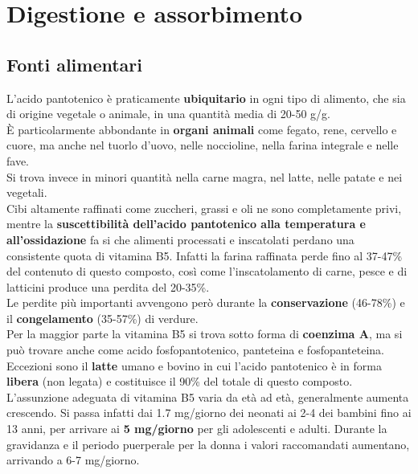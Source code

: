 \documentclass[a4paper, 12pt]{article}
\begin{document}
\section{Digestione e assorbimento}

\subsection{Fonti alimentari}
L’acido pantotenico è praticamente \textbf{ubiquitario} in ogni tipo di alimento, che sia di origine vegetale o animale, in una quantità media di 20-50 {\textmu}g/g.\\
È particolarmente abbondante in \textbf{organi animali} come fegato, rene, cervello e cuore, ma anche nel tuorlo d’uovo, nelle noccioline, nella farina integrale e nelle fave.\\
Si trova invece in minori quantità nella carne magra, nel latte, nelle patate e nei vegetali.\\
Cibi altamente raffinati come zuccheri, grassi e oli ne sono completamente privi, mentre la \textbf{suscettibilità dell’acido pantotenico alla temperatura e all’ossidazione} fa si che alimenti processati  e inscatolati perdano una consistente quota di vitamina B5. Infatti la farina raffinata perde fino al 37-47\% del contenuto di questo composto, così come l’inscatolamento di carne, pesce e di latticini produce una perdita del 20-35\%.\\
Le perdite più importanti avvengono però durante la \textbf{conservazione} (46-78\%) e il \textbf{congelamento} (35-57\%) di verdure.\\
Per la maggior parte la vitamina B5 si trova sotto forma di \textbf{coenzima A}, ma si può trovare anche come acido fosfopantotenico, panteteina e fosfopanteteina. Eccezioni sono il \textbf{latte} umano e bovino in cui l’acido pantotenico è in forma \textbf{libera} (non legata) e costituisce il 90\% del totale di questo composto.\\
L’assunzione adeguata di vitamina B5 varia da età ad età, generalmente aumenta crescendo. Si passa infatti dai 1.7 mg/giorno dei neonati ai 2-4 dei bambini fino ai 13 anni, per arrivare ai \textbf{5 mg/giorno} per gli adolescenti e adulti. Durante la gravidanza e il periodo puerperale per la donna i valori raccomandati aumentano, arrivando a 6-7 mg/giorno.
\end{document}
